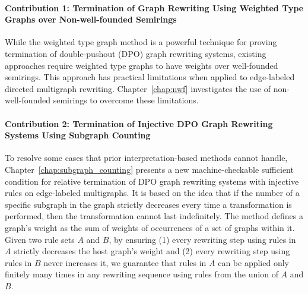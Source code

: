 \paragraph{Contribution 1: Termination of Graph Rewriting Using Weighted Type Graphs over Non-well-founded Semirings}

While the weighted type graph method is a powerful technique for proving termination of double-pushout (DPO) graph rewriting systems, existing approaches require weighted type graphs to have weights over well-founded semirings. This approach has practical limitations when applied to edge-labeled directed multigraph rewriting. Chapter~\ref{chap:nwf} investigates the use of non-well-founded semirings to overcome these limitations. 
 
\paragraph{Contribution 2: Termination of Injective DPO Graph Rewriting Systems Using Subgraph Counting} 

To resolve some cases that prior interpretation-based methods cannot handle, Chapter~\ref{chap:subgraph_counting} presents a new machine-checkable sufficient condition for relative termination of DPO graph rewriting systems with injective rules on edge-labeled multigraphs. 
It is based on the idea that if the number of a specific subgraph in the graph strictly decreases every time a transformation is performed, then the transformation cannot last indefinitely.
The method defines a graph's weight as the sum of weights of occurrences of a set of graphs within it. Given two rule sets $A$ and $B$, by ensuring 
(1) every rewriting step using rules in $A$ strictly decreases the host graph's weight and 
(2) every rewriting step using rules in $B$ never increases it, we guarantee that rules in $A$ can be applied only finitely many times in any rewriting sequence using rules from the union of $A$ and $B$. 

